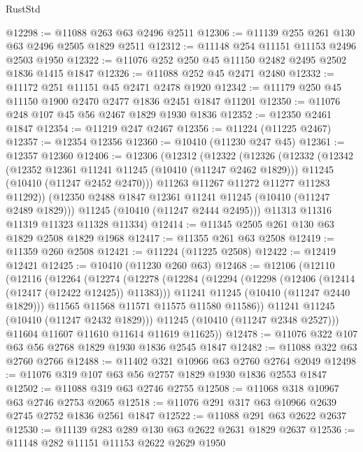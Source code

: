 \begin{lexlean}{RustStd}
\begin{coremodule}
@12298 := @11088 @263 @63 @2496 @2511
@12306 := @11139 @255 @261 @130 @63 @2496 @2505 @1829 @2511
@12312 := @11148 @254 @11151 @11153 @2496 @2503 @1950
@12322 := @11076 @252 @250 @45 @11150 @2482 @2495 @2502 @1836 @1415 @1847
@12326 := @11088 @252 @45 @2471 @2480
@12332 := @11172 @251 @11151 @45 @2471 @2478 @1920
@12342 := @11179 @250 @45 @11150 @1900 @2470 @2477 @1836 @2451 @1847 @11201
@12350 := @11076 @248 @107 @45 @56 @2467 @1829 @1930 @1836
@12352 := @12350 @2461 @1847
@12354 := @11219 @247 @2467
@12356 := @11224 (@11225 @2467)
@12357 := @12354 @12356
@12360 := @10410 (@11230 @247 @45)
@12361 := @12357 @12360
@12406 := @12306
    (@12312
      (@12322
        (@12326
          (@12332
            (@12342
              (@12352 @12361 @11241 @11245 (@10410 (@11247 @2462 @1829)))
              @11245
              (@10410 (@11247 @2452 @2470)))
            @11263
            @11267
            @11272
            @11277
            @11283
            @11292))
        (@12350 @2488 @1847 @12361 @11241 @11245 (@10410 (@11247 @2489 @1829)))
        @11245
        (@10410 (@11247 @2444 @2495)))
      @11313
      @11316
      @11319
      @11323
      @11328
      @11334)
@12414 := @11345 @2505 @261 @130 @63 @1829 @2508 @1829 @1968
@12417 := @11355 @261 @63 @2508
@12419 := @11359 @260 @2508
@12421 := @11224 (@11225 @2508)
@12422 := @12419 @12421
@12425 := @10410 (@11230 @260 @63)
@12468 := @12106
    (@12110
      (@12116
        (@12264
          (@12274
            (@12278
              (@12284
                (@12294
                  (@12298 (@12406 (@12414 (@12417 (@12422 @12425)) @11383)))
                  @11241
                  @11245
                  (@10410 (@11247 @2440 @1829)))
                @11565
                @11568
                @11571
                @11575
                @11580
                @11586))
            @11241
            @11245
            (@10410 (@11247 @2432 @1829)))
          @11245
          (@10410 (@11247 @2348 @2527)))
        @11604
        @11607
        @11610
        @11614
        @11619
        @11625))
@12478 := @11076 @322 @107 @63 @56 @2768 @1829 @1930 @1836 @2545 @1847
@12482 := @11088 @322 @63 @2760 @2766
@12488 := @11402 @321 @10966 @63 @2760 @2764 @2049
@12498 := @11076 @319 @107 @63 @56 @2757 @1829 @1930 @1836 @2553 @1847
@12502 := @11088 @319 @63 @2746 @2755
@12508 := @11068 @318 @10967 @63 @2746 @2753 @2065
@12518 := @11076 @291 @317 @63 @10966 @2639 @2745 @2752 @1836 @2561 @1847
@12522 := @11088 @291 @63 @2622 @2637
@12530 := @11139 @283 @289 @130 @63 @2622 @2631 @1829 @2637
@12536 := @11148 @282 @11151 @11153 @2622 @2629 @1950

\end{coremodule}
\end{lexlean}
